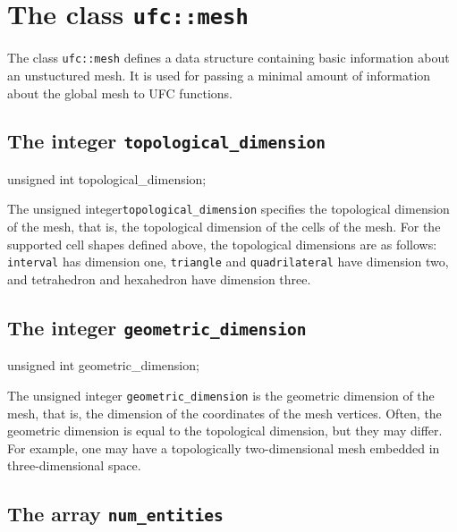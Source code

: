 \section{The class \texttt{ufc::mesh}}

The class \texttt{ufc::mesh} defines a data structure containing basic
information about an unstuctured mesh. It is used for passing a
minimal amount of information about the global mesh to UFC
functions.

\subsection{The integer \texttt{topological\_dimension}}

\begin{code}
unsigned int topological_dimension;
\end{code}

The unsigned integer\texttt{topological\_dimension}
specifies the topological dimension of the mesh, that is, the
topological dimension of the cells of the mesh. For the supported
cell shapes defined above, the topological dimensions are as follows:
\texttt{interval} has dimension one, \texttt{triangle} and
\texttt{quadrilateral} have dimension two, and tetrahedron and
hexahedron have dimension three.

\subsection{The integer \texttt{geometric\_dimension}}

\begin{code}
unsigned int geometric_dimension;
\end{code}

The unsigned integer \texttt{geometric\_dimension} is the geometric dimension
of the mesh, that is, the dimension of the coordinates of the mesh vertices.
Often, the geometric dimension is equal to the topological dimension,
but they may differ. For example, one may have a topologically
two-dimensional mesh embedded in three-dimensional space.

\subsection{The array \texttt{num\_entities}}

